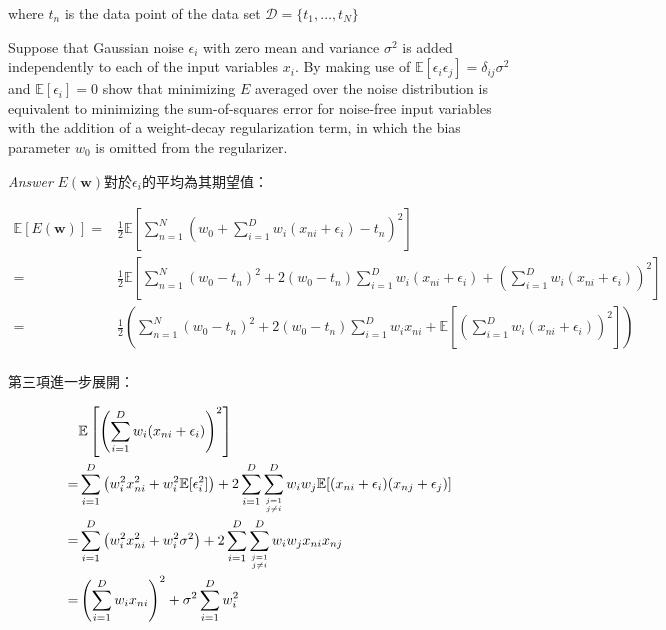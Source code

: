 \documentclass{article}
\begin{document}
where $t_n$ is the data point of the data set $\mathcal D=\{t_1, \ldots,t_N \}$

Suppose that Gaussian noise $\epsilon_i$ with zero mean and variance $\sigma^2$ is added independently to each of the input variables $x_i$.
By making use of $\mathbb E[\epsilon_i \epsilon_j] = \delta_{ij} \sigma^2$ and $\mathbb E[\epsilon_i] = 0$ show that minimizing $E$ averaged over the noise distribution is equivalent to minimizing the sum-of-squares error for noise-free input variables with the addition of a weight-decay regularization term, in which the bias parameter $w_0$ is omitted from the regularizer.

\emph{Answer} $E(\mathbf w)$對於$\epsilon_i$的平均為其期望值：

\begin{equation}\label{expectation}
\begin{aligned}
\mathbb E[E(\mathbf w)]
=& \frac{1}{2}\mathbb E\left[\sum\limits_{n=1}^N \left(w_0+\sum\limits_{i=1}^D w_i(x_{ni}+\epsilon_i)-t_n\right)^2\right]\\
=& \frac{1}{2}\mathbb E\left[\sum\limits_{n=1}^N (w_0-t_n)^2+2(w_0-t_n)\sum\limits_{i=1}^D w_i(x_{ni}+\epsilon_i)+\left(\sum\limits_{i=1}^D w_i(x_{ni}+\epsilon_i)\right)^2\right]\\
=& \frac{1}{2}\left(\sum\limits_{n=1}^N (w_0-t_n)^2+2(w_0-t_n)\sum\limits_{i=1}^D w_i x_{ni}+\mathbb E\left[\left(\sum\limits_{i=1}^D w_i(x_{ni}+\epsilon_i)\right)^2\right]\right)\\
\end{aligned}
\end{equation}

第三項進一步展開：

\begin{equation}
\begin{aligned}
& \mathbb E\left[\left(\sum\limits_{i=1}^D w_i(x_{ni}+\epsilon_i)\right)^2\right]\\
=& \sum\limits_{i=1}^D \left(w_i^2 x_{ni}^2 + w_i^2 \mathbb E[\epsilon_i^2]\right) + 2\sum\limits_{i=1}^D \sum\limits_{\genfrac{}{}{0pt}{2}{j=1}{j\neq i}}^D w_i w_j \mathbb E[(x_{ni}+\epsilon_i)(x_{nj}+\epsilon_j)] \\
=& \sum\limits_{i=1}^D \left(w_i^2 x_{ni}^2 + w_i^2 \sigma^2\right) + 2\sum\limits_{i=1}^D \sum\limits_{\genfrac{}{}{0pt}{2}{j=1}{j\neq i}}^D w_i w_j x_{ni} x_{nj}\\
=& \left(\sum\limits_{i=1}^D w_i x_{ni}\right)^2 + \sigma^2\sum\limits_{i=1}^D w_i^2
\end{aligned}
\end{equation}
\end{document}
